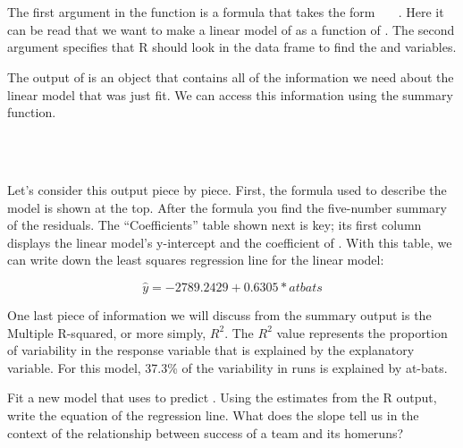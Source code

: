 \documentclass[11pt]{article}
\begin{document}
\ttfamily\noindent
\hlstd{}\hspace*{\fill}\\
\hlstd{}\hlassignement{\usebox{\hlnormalsizeboxlessthan}-}{\ }\hlkeyword{(}\hlkeyword{\urltilda{}}{\ }\hlkeyword{,}{\ }\hlargument{=}{\ }\hlkeyword{)}\hspace*{\fill}\\
\normalfont

The first argument in the function \texttt{} is a formula that takes the form \texttt{ {\ }\hlkeyword{\urltilda{}}{\ } }.  Here it can be read that we want to make a linear model of \texttt{} as a function of \texttt{}.  The second argument specifies that R should look in the \texttt{} data frame to find the \texttt{} and \texttt{} variables.

The output of \texttt{} is an object that contains all of the information we need about the linear model that was just fit.  We can access this information using the summary function.

\ttfamily\noindent
\hlstd{}\hspace*{\fill}\\
\hlstd{}\hlkeyword{(}\hlkeyword{)}\hspace*{\fill}\\
\normalfont

Let's consider this output piece by piece.  First, the formula used to describe the model is shown at the top. After the formula you find the five-number summary of the residuals. The ``Coefficients'' table shown next is key; its first column displays the linear model's y-intercept and the coefficient of \texttt{}. With this table, we can write down the least squares regression line for the linear model:

\[ \hat{y} = -2789.2429 + 0.6305 * atbats \]

One last piece of information we will discuss from the summary output is the Multiple R-squared, or more simply, $R^2$. The $R^2$ value represents the proportion of variability in the response variable that is explained by the explanatory variable. For this model, 37.3\% of the variability in runs is explained by at-bats.

\begin{exercise}
Fit a new model that uses \texttt{} to predict \texttt{}.  Using the estimates from the R output, write the equation of the regression line. What does the slope tell us in the context of the relationship between success of a team and its homeruns?
\end{exercise}
\end{document}
